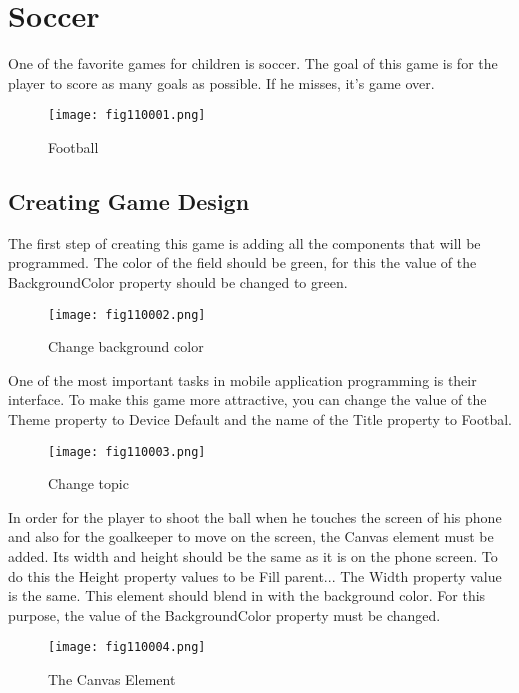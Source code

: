 \chapter{Soccer}

One of the favorite games for children is soccer. The goal of this game is for the player to score as many goals as possible. If he misses, it's game over.

\begin{figure}[H]
   \centering
   \texttt{[image: fig110001.png]}
   \caption{Football}
\label{fig110001}
\end{figure}

\section{Creating Game Design}
The first step of creating this game is adding all the components that will be programmed. The color of the field should be green, for this the value of the BackgroundColor property should be changed to green.

\begin{figure}[H]
   \centering
   \texttt{[image: fig110002.png]}
   \caption{Change background color}
\label{fig110002}
\end{figure}

One of the most important tasks in mobile application programming is their interface. To make this game more attractive, you can change the value of the Theme property to Device Default and the name of the Title property to Footbal.

\begin{figure}[H]
   \centering
   \texttt{[image: fig110003.png]}
   \caption{Change topic}
\label{fig110003}
\end{figure}

In order for the player to shoot the ball when he touches the screen of his phone and also for the goalkeeper to move on the screen, the Canvas element must be added. Its width and height should be the same as it is on the phone screen. To do this the Height property values to be Fill parent... The Width property value is the same. This element should blend in with the background color. For this purpose, the value of the BackgroundColor property must be changed.

\begin{figure}[H]
   \centering
   \texttt{[image: fig110004.png]}
   \caption{The Canvas Element}
\label{fig110004}
\end{figure}

